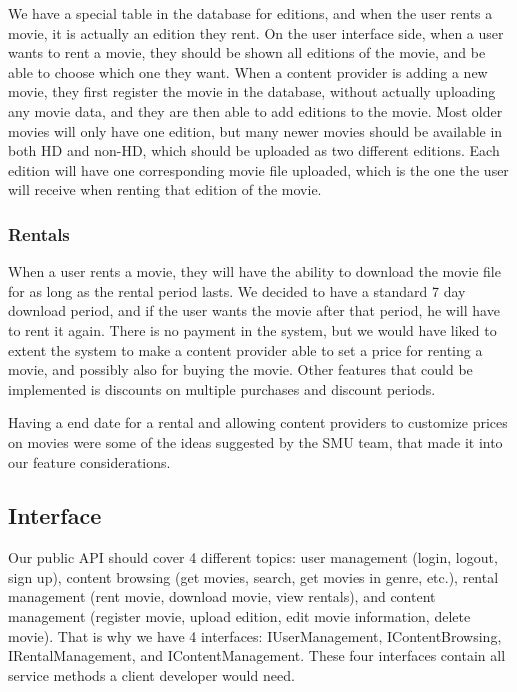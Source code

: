 We have a special table in the database for editions, and when the user rents a movie, it is actually an edition they rent. On the user interface side, when a user wants to rent a movie, they should be shown all editions of the movie, and be able to choose which one they want. When a content provider is adding a new movie, they first register the movie in the database, without actually uploading any movie data, and they are then able to add editions to the movie. Most older movies will only have one edition, but many newer movies should be available in both HD and non-HD, which should be uploaded as two different editions. Each edition will have one corresponding movie file uploaded, which is the one the user will receive when renting that edition of the movie.

\subsubsection{Rentals}
\label{Design_Service_Analysis_Rentals}
When a user rents a movie, they will have the ability to download the movie file for as long as the rental period lasts. We decided to have a standard 7 day download period, and if the user wants the movie after that period, he will have to rent it again. There is no payment in the system, but we would have liked to extent the system to make a content provider able to set a price for renting a movie, and possibly also for buying the movie. Other features that could be implemented is discounts on multiple purchases and discount periods.

Having a end date for a rental and allowing content providers to customize prices on movies were some of the ideas suggested by the SMU team, that made it into our feature considerations. 

\subsection{Interface}
\label{Design_Service_Interface}
Our public API should cover 4 different topics: user management (login, logout, sign up), content browsing (get movies, search, get movies in genre, etc.), rental management (rent movie, download movie, view rentals), and content management (register movie, upload edition, edit movie information, delete movie). That is why we have 4 interfaces: IUserManagement, IContentBrowsing, IRentalManagement, and IContentManagement. These four interfaces contain all service methods a client developer would need.

